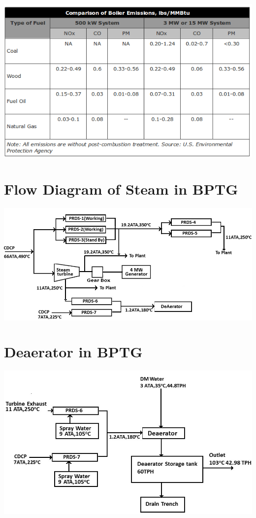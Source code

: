 \documentclass[english,11pt]{report}
\begin{document}
\includegraphics[width = 6in]{dmt3.png}

\section{Flow Diagram of Steam in BPTG}
\includegraphics[width = 6in]{bptgflow.png}

\section{Deaerator in BPTG}
\includegraphics[width = 6in]{bptgdeaerator.png}
\end{document}

